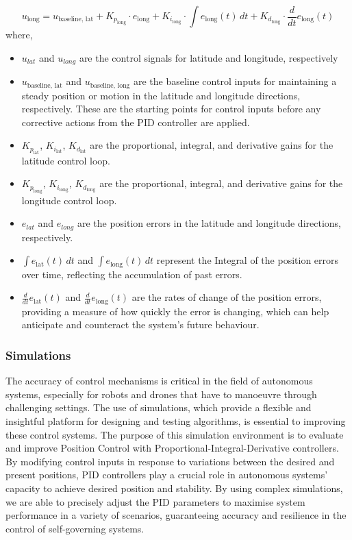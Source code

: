 \documentclass{article}
\begin{document}
\begin{equation}
  u_{\text{long}} = u_{\text{baseline, lat}} + K_{p_{\text{long}}} \cdot e_{\text{long}} + K_{i_{\text{long}}} \cdot \int e_{\text{long}}(t) \, dt + K_{d_{\text{long}}} \cdot \frac{d}{dt}e_{\text{long}}(t)
\end{equation}
where, 
\begin{itemize}
  \item \(u_{lat}\) and \(u_{long}\) are the control signals for latitude and
  longitude, respectively
  \item \(u_{\text{baseline, lat}}\) and \(u_{\text{baseline, long}}\) are the
  baseline control inputs for maintaining a steady position or motion in the
  latitude and longitude directions, respectively. These are the starting points
  for control inputs before any corrective actions from the PID controller are
  applied.
  \item \( K_{p_{\text{lat}}}\), \( K_{i_{\text{lat}}}\), \(
  K_{d_{\text{lat}}}\) are the proportional, integral, and derivative gains for
  the latitude control loop.
  \item \( K_{p_{\text{long}}}\), \( K_{i_{\text{long}}}\), \(
  K_{d_{\text{long}}}\) are the proportional, integral, and derivative gains for
  the longitude control loop.
  \item \(e_{lat}\) and \(e_{long}\) are the position errors in the latitude and
  longitude directions, respectively.
  \item \(\int e_{\text{lat}}(t) \, dt\) and \(\int e_{\text{long}}(t) \, dt\)
  represent the Integral of the position errors over time, reflecting the
  accumulation of past errors.
  \item \(\frac{d}{dt}e_{\text{lat}}(t)\) and \(\frac{d}{dt}e_{\text{long}}(t)\)
  are the rates of change of the position errors, providing a measure of how
  quickly the error is changing, which can help anticipate and counteract the
  system's future behaviour.
\end{itemize}

\subsubsection{Simulations}\label{PID_simulations} The accuracy of control
mechanisms is critical in the field of autonomous systems, especially for robots
and drones that have to manoeuvre through challenging settings. The use of
simulations, which provide a flexible and insightful platform for designing and
testing algorithms, is essential to improving these control systems. The purpose
of this simulation environment is to evaluate and improve Position Control with
Proportional-Integral-Derivative controllers. By modifying control inputs in
response to variations between the desired and present positions, PID
controllers play a crucial role in autonomous systems' capacity to achieve
desired position and stability. By using complex simulations, we are able to
precisely adjust the PID parameters to maximise system performance in a variety
of scenarios, guaranteeing accuracy and resilience in the control of
self-governing systems.
\end{document}
